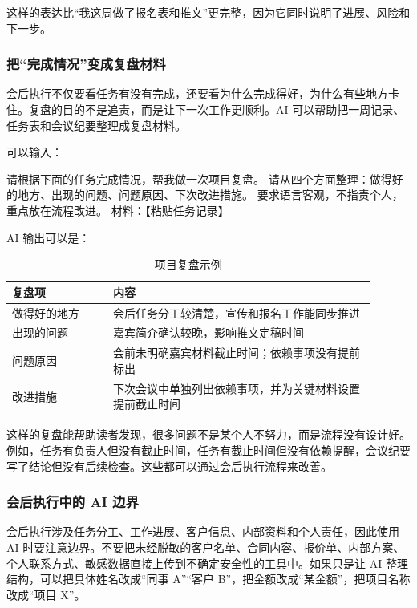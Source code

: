 这样的表达比“我这周做了报名表和推文”更完整，因为它同时说明了进展、风险和下一步。

\subsubsection*{把“完成情况”变成复盘材料}

会后执行不仅要看任务有没有完成，还要看为什么完成得好，为什么有些地方卡住。复盘的目的不是追责，而是让下一次工作更顺利。AI 可以帮助把一周记录、任务表和会议纪要整理成复盘材料。

可以输入：

\begin{tcolorbox}[promptbox]
请根据下面的任务完成情况，帮我做一次项目复盘。
请从四个方面整理：做得好的地方、出现的问题、问题原因、下次改进措施。
要求语言客观，不指责个人，重点放在流程改进。
材料：【粘贴任务记录】
\end{tcolorbox}

AI 输出可以是：

\begin{table}[H]
\centering
\caption{项目复盘示例}
\label{tab:project-review-example}
\begin{tabular}{p{0.25\linewidth} p{0.65\linewidth}}
\toprule
\textbf{复盘项} & \textbf{内容} \\
\midrule
做得好的地方 & 会后任务分工较清楚，宣传和报名工作能同步推进 \\
出现的问题 & 嘉宾简介确认较晚，影响推文定稿时间 \\
问题原因 & 会前未明确嘉宾材料截止时间；依赖事项没有提前标出 \\
改进措施 & 下次会议中单独列出依赖事项，并为关键材料设置提前截止时间 \\
\bottomrule
\end{tabular}
\end{table}

这样的复盘能帮助读者发现，很多问题不是某个人不努力，而是流程没有设计好。例如，任务有负责人但没有截止时间，任务有截止时间但没有依赖提醒，会议纪要写了结论但没有后续检查。这些都可以通过会后执行流程来改善。

\subsubsection*{会后执行中的 AI 边界}

会后执行涉及任务分工、工作进展、客户信息、内部资料和个人责任，因此使用 AI 时要注意边界。不要把未经脱敏的客户名单、合同内容、报价单、内部方案、个人联系方式、敏感数据直接上传到不确定安全性的工具中。如果只是让 AI 整理结构，可以把具体姓名改成“同事 A”“客户 B”，把金额改成“某金额”，把项目名称改成“项目 X”。

